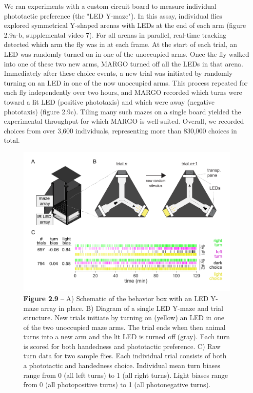 \documentclass[12pt,letterpaper]{article}
\begin{document}
We ran experiments with a custom circuit board to measure individual phototactic preference (the "LED Y-maze"). In this assay, individual flies explored symmetrical Y-shaped arenas with LEDs at the end of each arm (figure 2.9a-b, supplemental video 7). For all arenas in parallel, real-time tracking detected which arm the fly was in at each frame. At the start of each trial, an LED was randomly turned on in one of the unoccupied arms. Once the fly walked into one of these two new arms, MARGO turned off all the LEDs in that arena. Immediately after these choice events, a new trial was initiated by randomly turning on an LED in one of the now unoccupied arms. This process repeated for each fly independently over two hours, and MARGO recorded which turns were toward a lit LED (positive phototaxis) and which were away (negative phototaxis) (figure 2.9c). Tiling many such mazes on a single board yielded the experimental throughput for which MARGO is well-suited. Overall, we recorded choices from over 3,600 individuals, representing more than 830,000 choices in total.

\begin{figure}[t!]
 \includegraphics[width=\textwidth]{../figures/chapter_2/fig_2-9.pdf}
 \vspace{.1in}
 \caption*{\textbf{Figure 2.9} -- A) Schematic of the behavior box with an LED Y-maze array in place. B) Diagram of a single LED Y-maze and trial structure. New trials initiate by turning on (yellow) an LED in one of the two unoccupied maze arms. The trial ends when then animal turns into a new arm and the lit LED is turned off (gray). Each turn is scored for both handedness and phototactic preference. C) Raw turn data for two sample flies. Each individual trial consists of both a phototactic and handedness choice. Individual mean turn biases range from 0 (all left turns) to 1 (all right turns). Light biases range from 0 (all photopositive turns) to 1 (all photonegative turns).}
\end{figure}
\end{document}
